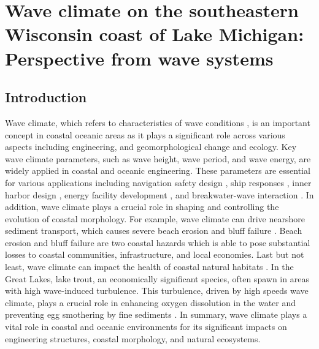 \chapter{Wave climate on the southeastern Wisconsin coast of Lake Michigan: Perspective from wave systems}
\label{chapter4}

\section{Introduction}
\label{c4_Introduction}

Wave climate, which refers to characteristics of wave conditions
\citep{wiegel_oceanographical_2013}, is an important concept in coastal oceanic
areas as it plays a significant role across various aspects including
engineering, and geomorphological change and ecology. Key wave climate
parameters, such as wave height, wave period, and wave energy, are widely
applied in coastal and oceanic engineering. These parameters are essential for
various applications including navigation safety design
\citep{lee_boundary_2009,phelps_ship_1995}, ship responses
\citep{phelps_ship_1995}, inner harbor design
\citep{romano-moreno_multimodal_2023}, energy facility development
\citep{lee_boundary_2009,liu_wind_2017} , and breakwater-wave interaction
\citep{jiang_wave_2017,lee_comparison_2006}. In addition, wave climate plays a
crucial role in shaping and controlling the evolution of coastal morphology. For
example, wave climate can drive nearshore sediment transport, which causes
severe beach erosion and bluff failure
\citep{benumof_relationship_2000,brown_factors_2005,lamoe_wave_1989}. Beach
erosion and bluff failure are two coastal hazards which is able to pose
substantial losses to coastal communities, infrastructure, and local economies.
Last but not least, wave climate can impact the health of coastal natural
habitats \citep{meadows_cumulative_2005}. In the Great Lakes, lake trout, an
economically significant species, often spawn in areas with high wave-induced
turbulence.  This turbulence, driven by high speeds wave climate, plays a
crucial role in enhancing oxygen dissolution in the water and preventing egg
smothering by fine sediments
\citep{fitzsimons_relationship_2014,sly_interstitial_1988}. In summary, wave
climate plays a vital role in coastal and oceanic environments for its
significant impacts on engineering structures, coastal morphology, and natural
ecosystems.

